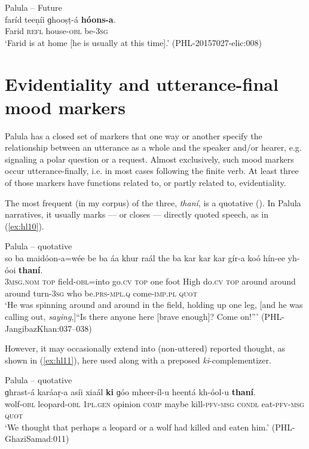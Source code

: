\documentclass[output=paper]{langsci/langscibook}
\begin{document}
\begin{exe}
	\ex Palula -- Future \label{ex:hl9}\\
	\gll faríd teeṇíi ɡhooṣṭ-á \textbf{hóons-a}.\\
	Farid \textsc{refl} house-\textsc{obl} be-3\textsc{sg}\\
	\trans ‘Farid is at home [he is usually at this time].’ (PHL-20157027-elic:008)
\end{exe}


\section{Evidentiality and utterance-final mood markers}\label{s:hl4}

Palula has a closed set of markers that one way or another specify the relationship between an utterance as a whole and the speaker and/or hearer, e.g. signaling a polar question or a request. Almost exclusively, such mood markers occur utterance-finally, i.e. in most cases following the finite verb. At least three of those markers have functions related to, or partly related to, evidentiality.

The most frequent (in my corpus) of the three, \textit{thaní}, is a quotative (\citealt[267, 377–387]{Liljegren2016}). In Palula narratives, it usually marks — or closes — directly quoted speech, as in ‎(\ref{ex:hl10}).

\begin{exe}
	\ex Palula -- quotative \label{ex:hl10}\\
	\gll so ba maidóon-a=wée be ba áa khur raál the ba kar kar kar gír-a koó hín-ee yh-óoi \textbf{thaní}.\\
	3\textsc{msg}.\textsc{nom} \textsc{top} field-\textsc{obl}=into go.\textsc{cv} \textsc{top} one foot High do.\textsc{cv} \textsc{top} around around around turn-3\textsc{sg} who be.\textsc{prs}-\textsc{mpl}.\textsc{q} come-\textsc{imp}.\textsc{pl} \textsc{quot}\\
	\trans ‘He was spinning around and around in the field, holding up one leg, [and he was calling out, \textit{saying},]``Is there anyone here [brave enough]? Come on!''’ (PHL-JangibazKhan:037–038)
\end{exe}

However, it may occasionally extend into (non-uttered) reported thought, as shown in ‎(\ref{ex:hl11}), here used along with a preposed \textit{ki}-complementizer.

\begin{exe}
	\ex Palula -- quotative \label{ex:hl11}\\
	\gll ɡhrast-á karáaṛ-a asíi xiaál \textbf{ki} ɡóo mheer-íl-u heentá kh-óol-u \textbf{thaní}.\\
	wolf-\textsc{obl} leopard-\textsc{obl} 1\textsc{pl}.\textsc{gen} opinion \textsc{comp} maybe kill-\textsc{pfv}-\textsc{msg} \textsc{condl} eat-\textsc{pfv}-\textsc{msg} \textsc{quot}\\
	\trans ‘We thought that perhaps a leopard or a wolf had killed and eaten him.’ (PHL-GhaziSamad:011)
\end{exe}
\end{document}
